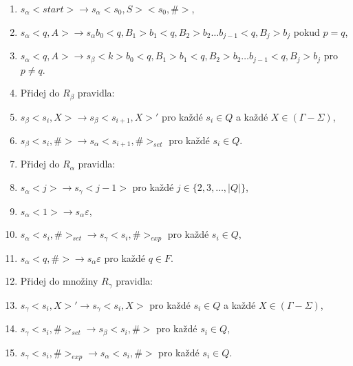 \begin{Alg}
\begin{list}{}{\setlength\parsep{0cm} \setlength\itemsep{0cm} \setlength\leftmargin{1em}}
\begin{enumerate}
\renewcommand{\labelenumi}{(\roman{enumi})}

   \item $s_\alpha <start> \rightarrow s_\alpha <s_0, S> <s_0, \#>$,
   \item  $s_\alpha <q, A> \rightarrow s_\alpha b_0 <q, B_1> b_1 <q, B_2> b_2 \dots b_{j-1} <q, B_j> b_j$ pokud $p = q$,
   \item  $s_\alpha <q, A> \rightarrow s_\beta <k> b_0 <q, B_1> b_1 <q, B_2> b_2 \dots b_{j-1} <q, B_j> b_j$ pro $p \ne q$. 


   \item Přidej do $R_\beta$ pravidla:

\renewcommand{\labelenumi}{(\roman{enumi})}

   \item $s_\beta <s_i, X> \rightarrow s_\beta <s_{i+1}, X>'$ pro každé $s_i \in Q$ a každé $X \in (\Gamma - \Sigma)$,
   \item $s_\beta <s_i, \#> \rightarrow s_\alpha <s_{i+1}, \#>_{set}$ pro každé $s_i \in Q$.


   \item Přidej do $R_\alpha$ pravidla:

\renewcommand{\labelenumi}{(\roman{enumi})}

   \item $s_\alpha <j> \rightarrow s_\gamma <j - 1 > $ pro každé $j \in \{2,3,\dots,|Q|\}$,
   \item $s_\alpha <1> \rightarrow s_\alpha \varepsilon $,
   \item $s_\alpha <s_i, \#>_{set} \rightarrow s_\gamma <s_{i}, \#>_{exp}$ pro každé $s_i \in Q$,
   \item $s_\alpha <q, \#> \rightarrow s_\alpha \varepsilon $ pro každé $q \in F$.


   \item Přidej do množiny $R_\gamma$ pravidla:

\renewcommand{\labelenumi}{(\roman{enumi})}

   \item $s_\gamma <s_i, X>' \rightarrow s_\gamma <s_i, X> $ pro každé $s_i \in Q$ a každé $X \in (\Gamma - \Sigma)$,
   \item $s_\gamma <s_i, \#>_{set} \rightarrow s_\beta <s_i, \#>$ pro každé $s_i \in Q$,
   \item $s_\gamma <s_i, \#>_{exp} \rightarrow s_\alpha <s_{i}, \#>$ pro každé $s_i \in Q$.

\end{enumerate}

\end{list}
\end{Alg}


